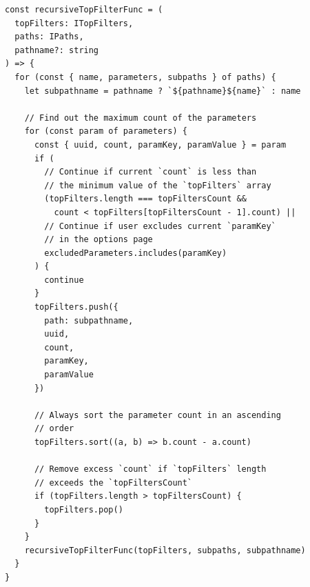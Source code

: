 \begin{lstlisting}[style=ES6, caption={Recursive function to get the top filters (TypeScript)}, label={lst:recursiveTopFiltersFunc}]
const recursiveTopFilterFunc = (
  topFilters: ITopFilters,
  paths: IPaths,
  pathname?: string
) => {
  for (const { name, parameters, subpaths } of paths) {
    let subpathname = pathname ? `${pathname}${name}` : name

    // Find out the maximum count of the parameters
    for (const param of parameters) {
      const { uuid, count, paramKey, paramValue } = param
      if (
        // Continue if current `count` is less than
        // the minimum value of the `topFilters` array
        (topFilters.length === topFiltersCount &&
          count < topFilters[topFiltersCount - 1].count) ||
        // Continue if user excludes current `paramKey`
        // in the options page
        excludedParameters.includes(paramKey)
      ) {
        continue
      }
      topFilters.push({
        path: subpathname,
        uuid,
        count,
        paramKey,
        paramValue
      })

      // Always sort the parameter count in an ascending
      // order
      topFilters.sort((a, b) => b.count - a.count)

      // Remove excess `count` if `topFilters` length
      // exceeds the `topFiltersCount`
      if (topFilters.length > topFiltersCount) {
        topFilters.pop()
      }
    }
    recursiveTopFilterFunc(topFilters, subpaths, subpathname)
  }
}
\end{lstlisting}
